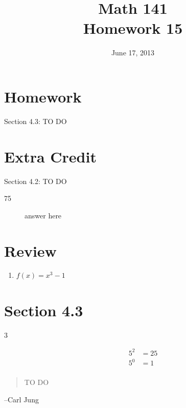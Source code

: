 \documentclass{exam}
\date{June 17, 2013}
\author{}
\title{Math 141 \\ Homework 15}
\begin{document}
  \maketitle

  \section{Homework}

  Section 4.3: TO DO

 \section{Extra Credit}
  Section 4.2: TO DO

  \ifprintanswers
    \begin{description}
      \item[75]
        answer here
    \end{description}
  \fi

  \section{Review}

  \begin{enumerate}

    \item $f(x) = x^3 - 1$ 

  \end{enumerate}

  \ifprintanswers
    \section{Section 4.3}

    \begin{description}

      \item[3] 
        \begin{align*}
          5^2 &= 25 \\
          5^0 &= 1 \\
        \end{align*}

    \end{description}

  \else
    \vspace{2 cm}
    \begin{quote}
      \begin{em}
        TO DO
      \end{em}
    \end{quote}

    \hspace{1 cm} --Carl Jung
  \fi
\end{document}
